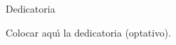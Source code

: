 \vspace*{2.5cm}

\begin{center}
{\large Dedicatoria}
\end{center}
\vspace{1cm}

Colocar aqu\'{\i} la dedicatoria (optativo).

\newpage
